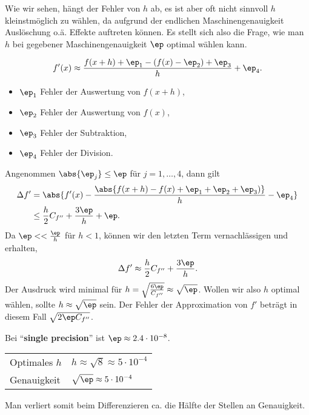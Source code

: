 Wie wir sehen, hängt der Fehler von $h$ ab, es ist aber oft nicht sinnvoll $h$
kleinstmöglich zu wählen, da aufgrund der endlichen Maschinengenauigkeit
Auslöschung o.ä. Effekte auftreten können. Es stellt sich also die Frage, wie
man $h$ bei gegebener Maschinengenauigkeit $\ep$ optimal wählen kann.
\begin{bemn}
\begin{align*}
f'(x) \approx \dfrac{f(x+h) + \ep_1 - (f(x)-\ep_2) + \ep_3}{h} + \ep_4.
\end{align*}
\begin{itemize}[label=-]
  \item $\ep_1$ Fehler der Auswertung von $f(x+h)$,
  \item $\ep_2$ Fehler der Auswertung von $f(x)$,
  \item $\ep_3$ Fehler der Subtraktion,
  \item $\ep_4$ Fehler der Division.
\end{itemize}

Angenommen $\abs{\ep_j} \le \ep$ für $j=1,\ldots,4$, dann gilt
\begin{align*}
\Delta f' &= \abs{f'(x)-\frac{\abs{f(x+h)-f(x)+\ep_1+\ep_2+\ep_3)}}{h}-\ep_4}
\\ &\le \frac{h}{2}C_{f''} + \frac{3\ep}{h} + \ep.
\end{align*}
Da $\ep << \frac{\ep}{h}$ für $h<1$, können wir den letzten Term
vernachlässigen und erhalten,
\begin{align*}
\Delta f' \approx \frac{h}{2}C_{f''} + \frac{3\ep}{h}.
\end{align*}
Der Ausdruck wird minimal für $h=\sqrt{\frac{6\ep}{C_{f''}}} \approx
\sqrt{\ep}$. Wollen wir also $h$ optimal wählen, sollte $h\approx\sqrt{\ep}$
sein. 
Der Fehler der Approximation von $f'$ beträgt in diesem Fall $\sqrt{2\ep
C_{f''}}$.
\end{bemn}

\begin{bspn}
Bei ``\textbf{single precision}'' ist $\ep\approx 2.4\cdot 10^{-8}$.

\begin{tabular}[h]{ll}
Optimales $h$ & $h\approx\sqrt{8} \approx 5\cdot 10^{-4}$\\
Genauigkeit & $\sqrt{\ep} \approx 5\cdot 10^{-4}$
\end{tabular}

Man verliert somit beim Differenzieren ca. die Hälfte der Stellen an
Genauigkeit.
\end{bspn}